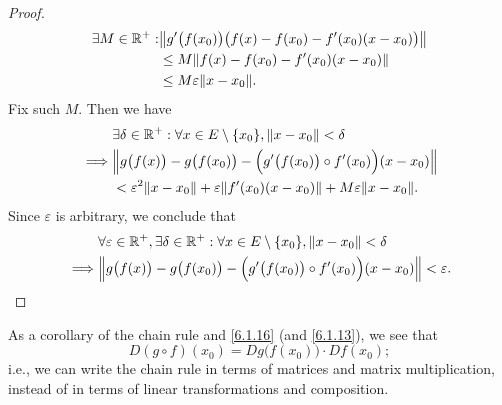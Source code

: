 \begin{proof}
  \begin{align*}
    \exists M \in \R^+ : & \norm*{g'\big(f(x_0)\big) \big(f(x) - f(x_0) - f'(x_0) (x - x_0)\big)} \\
                         & \leq M \norm*{f(x) - f(x_0) - f'(x_0) (x - x_0)}                       \\
                         & \leq M \varepsilon \norm*{x - x_0}.
  \end{align*}
  Fix such \(M\).
  Then we have
  \begin{align*}
             & \exists \delta \in \R^+ : \forall x \in E \setminus \set{x_0}, \norm*{x - x_0} < \delta                 \\
    \implies & \norm*{g\big(f(x)\big) - g\big(f(x_0)\big) - \Big(g'\big(f(x_0)\big) \circ f'(x_0)\Big) (x - x_0)}      \\
             & < \varepsilon^2 \norm*{x - x_0} + \varepsilon \norm*{f'(x_0)(x - x_0)} + M \varepsilon \norm*{x - x_0}.
  \end{align*}
  Since \(\varepsilon\) is arbitrary, we conclude that
  \begin{align*}
             & \forall \varepsilon \in \R^+, \exists \delta \in \R^+ : \forall x \in E \setminus \set{x_0}, \norm*{x - x_0} < \delta \\
    \implies & \norm*{g\big(f(x)\big) - g\big(f(x_0)\big) - \Big(g'\big(f(x_0)\big) \circ f'(x_0)\Big) (x - x_0)} < \varepsilon.
  \end{align*}
\end{proof}

\begin{note}
  As a corollary of the chain rule and \cref{6.1.16} (and \cref{6.1.13}), we see that
  \[
    D (g \circ f)(x_0) = D g\big(f(x_0)\big) \cdot D f(x_0);
  \]
  i.e., we can write the chain rule in terms of matrices and matrix multiplication, instead of in terms of linear transformations and composition.
\end{note}

